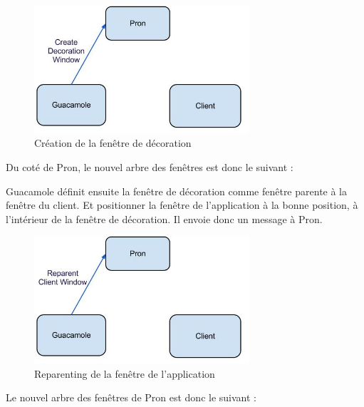 \begin{figure}[H]
  \centering
  \includegraphics[width=8cm]{images/Guacamole_anim_4.jpg}
  \caption{Création de la fenêtre de décoration}
  \label{fig:guacamole_anim_4}
\end{figure}

Du coté de Pron, le nouvel arbre des fenêtres est donc le suivant :

\begin{center}
\end{center}

Guacamole définit ensuite la fenêtre de décoration comme fenêtre parente à la fenêtre du client.
Et positionner la fenêtre de l'application à la bonne position, à l'intérieur de la fenêtre de décoration.
Il envoie donc un message à Pron.

\begin{figure}[H]
  \centering
  \includegraphics[width=8cm]{images/Guacamole_anim_5.jpg}
  \caption{Reparenting de la fenêtre de l'application}
  \label{fig:guacamole_anim_5}
\end{figure}

Le nouvel arbre des fenêtres de Pron est donc le suivant :

